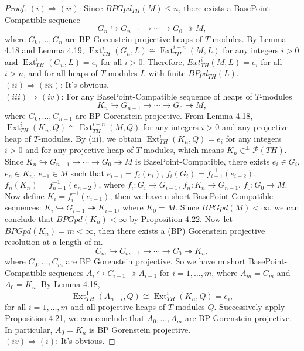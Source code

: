 \documentclass[11pt, twoside]{article}
\begin{document}
\begin{proof}
$(i) \Rightarrow (ii)$: Since $BPGpd_{TH}(M)\leq n $, there exists a BasePoint-Compatible sequence
$$G_n\hookrightarrow G_{n-1} \rightarrow \cdots \rightarrow G_0\twoheadrightarrow M,$$
where $G_0,\ldots,G_{n}$ are BP Gorenstein projective heaps of $T$-modules. By Lemma 4.18 and Lemma 4.19, $\operatorname{Ext}_{TH}^i(G_n,L)\cong \operatorname{Ext}_{TH}^{i+n}(M,L)$ for any integers $i>0$ and $\operatorname{Ext}_{TH}^{i}(G_n, L)=e_i$ for all $i>0$. Therefore, $Ext_{TH}^{i}(M, L) = e_i$ for all $i > n$, and for all heaps of $T$-modules $L$ with finite $BPpd_{TH}(L)$.\\
$(ii) \Rightarrow (iii)$: It's obvious.\\
$(iii) \Rightarrow (iv)$: For any BasePoint-Compatible sequence of heaps of $T$-modules
$$K_{n} \hookrightarrow G_{n-1} \to \cdots \to G_{0} \twoheadrightarrow M,$$
where $G_{0}, \dots, G_{n-1}$ are BP Gorenstein projective. From Lemma 4.18, $\operatorname{Ext}_{TH}^i(K_n,Q)\cong \operatorname{Ext}_{TH}^{i+n}(M,Q)$ for any integers $i>0$ and any projective heap of $T$-modules. By (iii), we obtain $\operatorname{Ext}_{TH}^i(K_n,Q)=e_i$ for any integers $i>0$ and for any projective heap of $T$-modules, which means $K_n\in ^\bot\mathcal{P}(TH)$. Since $K_{n} \hookrightarrow G_{n-1} \to \cdots \to G_{0} \twoheadrightarrow M$ is BasePoint-Compatible, there exists $e_i\in G_i$, $e_n\in K_n$, $e_{-1}\in M$ such that $e_{i-1}=f_{i}(e_i)$, $f_i(G_i)= f^{-1}_{i-1}(e_{i-2})$, $f_n(K_n)= f^{-1}_{n-1}(e_{n-2})$, where $f_{i}:G_i\rightarrow G_{i-1}$, $f_{n}:K_n\rightarrow G_{n-1}$, $f_{0}:G_0\rightarrow M$. Now define $K_i=f^{-1}_i(e_{i-1})$, then we have n short BasePoint-Compatible sequences: $K_i\hookrightarrow G_{i-1} \twoheadrightarrow K_{i-1}$, where $K_0=M$. Since $BPGpd(M)<\infty$, we can conclude that $BPGpd(K_n)<\infty$ by Proposition 4.22. Now let $BPGpd(K_n)= m <\infty$, then there exists a (BP) Gorenstein projective resolution at a length of m.
$$ C_m \hookrightarrow C_{m-1} \rightarrow \cdots \rightarrow C_0 \twoheadrightarrow K_n,$$
where $C_{0}, \dots, C_{m}$ are BP Gorenstein projective. So we have m short BasePoint-Compatible sequences $A_i\hookrightarrow C_{i-1} \twoheadrightarrow A_{i-1}$ for $i=1,\ldots,m$, where $A_m=C_m$ and $A_0=K_n$. By Lemma 4.18,
$$\operatorname{Ext}_{TH}^1(A_{n-i},Q)\cong \operatorname{Ext}_{TH}^{i}(K_n,Q)=e_i,$$
for all $i=1,\ldots,m$ and all projective heaps of $T$-modules $Q$. Successively apply Proposition 4.21, we can conclude that $A_{0}, \dots, A_{m}$ are BP Gorenstein projective. In particular, $A_0=K_n$ is BP Gorenstein projective.\\
$(iv) \Rightarrow (i)$: It's obvious.
\end{proof}
\end{document}
